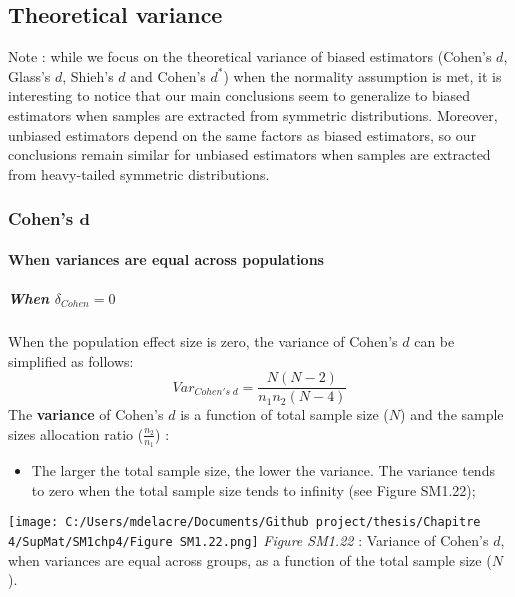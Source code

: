 \documentclass[
  english,
  man,mask,floatsintext]{apa6}
\providecommand{\tightlist}{%
  \setlength{\itemsep}{0pt}\setlength{\parskip}{0pt}}
\let\oldparagraph\paragraph
\renewcommand{\paragraph}[1]{\oldparagraph{#1}\mbox{}}
\let\oldsubparagraph\subparagraph
\renewcommand{\subparagraph}[1]{\oldsubparagraph{#1}\mbox{}}
\begin{document}
\newpage

\hypertarget{theoretical-variance}{%
\subsection{Theoretical variance}\label{theoretical-variance}}

Note : while we focus on the theoretical variance of biased estimators (Cohen's \(d\), Glass's \(d\), Shieh's \(d\) and Cohen's \(d^*\)) when the normality assumption is met, it is interesting to notice that our main conclusions seem to generalize to biased estimators when samples are extracted from symmetric distributions. Moreover, unbiased estimators depend on the same factors as biased estimators, so our conclusions remain similar for unbiased estimators when samples are extracted from heavy-tailed symmetric distributions.

\hypertarget{cohens-bmd}{%
\subsubsection{\texorpdfstring{Cohen's \(\bm{d}\)}{Cohen's \textbackslash bm\{d\}}}\label{cohens-bmd}}

\hypertarget{when-variances-are-equal-across-populations-2}{%
\paragraph{When variances are equal across populations}\label{when-variances-are-equal-across-populations-2}}

\hypertarget{when-delta_cohen0}{%
\subparagraph{\texorpdfstring{When \(\delta_{Cohen}=0\)}{When \textbackslash delta\_\{Cohen\}=0}}\label{when-delta_cohen0}}

When the population effect size is zero, the variance of Cohen's \(d\) can be simplified as follows:
\[Var_{Cohen's \; d} = \frac{N(N-2)}{n_1n_2(N-4)}\]
The \textbf{variance} of Cohen's \(d\) is a function of total sample size (\(N\)) and the sample sizes allocation ratio (\(\frac{n_2}{n_1}\)) :

\newpage

\begin{itemize}
\tightlist
\item
  The larger the total sample size, the lower the variance. The variance tends to zero when the total sample size tends to infinity (see Figure SM1.22);
\end{itemize}

\texttt{[image: C:/Users/mdelacre/Documents/Github project/thesis/Chapitre 4/SupMat/SM1chp4/Figure SM1.22.png]}
\emph{Figure SM1.22} : Variance of Cohen's \(d\), when variances are equal across groups, as a function of the total sample size (\(N\)).
\end{document}
